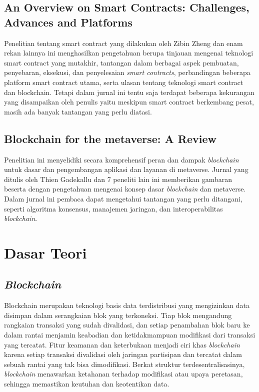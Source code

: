 \subsection{An Overview on Smart Contracts: Challenges, Advances and Platforms}
Penelitian tentang smart contract yang dilakukan oleh Zibin Zheng dan enam rekan lainnya ini menghasilkan pengetahuan berupa tinjauan mengenai teknologi smart contract yang mutakhir, tantangan dalam berbagai aspek pembuatan, penyebaran, eksekusi, dan penyelesaian \emph{smart contracts}, perbandingan beberapa platform smart contract utama, serta ulasan tentang teknologi smart contract dan blockchain. Tetapi dalam jurnal ini tentu saja terdapat beberapa kekurangan yang disampaikan oleh penulis yaitu meskipun smart contract berkembang pesat, masih ada banyak tantangan yang perlu diatasi.

\subsection{Blockchain for the metaverse: A Review}
Penelitian ini menyelidiki secara komprehensif peran dan dampak \emph{blockchain} untuk dasar dan pengembangan aplikasi dan layanan di metaverse. Jurnal yang ditulis oleh Thien Gadekallu dan 7 peneliti lain ini memberikan gambaran beserta dengan pengetahuan mengenai konsep dasar \emph{blockchain} dan metaverse. Dalam jurnal ini pembaca dapat mengetahui tantangan yang perlu ditangani, seperti algoritma konsensus, manajemen jaringan, dan interoperabilitas \emph{blockchain}. 

\section{Dasar Teori}

\subsection{\emph{Blockchain}}
Blockchain merupakan teknologi basis data terdistribusi yang mengizinkan data disimpan dalam serangkaian blok yang terkoneksi. Tiap blok mengandung rangkaian transaksi yang sudah divalidasi, dan setiap penambahan blok baru ke dalam rantai menjamin keabadian dan ketidakmampuan modifikasi dari transaksi yang tercatat. Fitur keamanan dan keterbukaan menjadi ciri khas \emph{blockchain} karena setiap transaksi divalidasi oleh jaringan partisipan dan tercatat dalam sebuah rantai yang tak bisa dimodifikasi. Berkat struktur terdesentralisasinya, \emph{blockchain} menawarkan ketahanan terhadap modifikasi atau upaya peretasan, sehingga memastikan keutuhan dan keotentikan data. \parencite{Tjokrosetio22}

